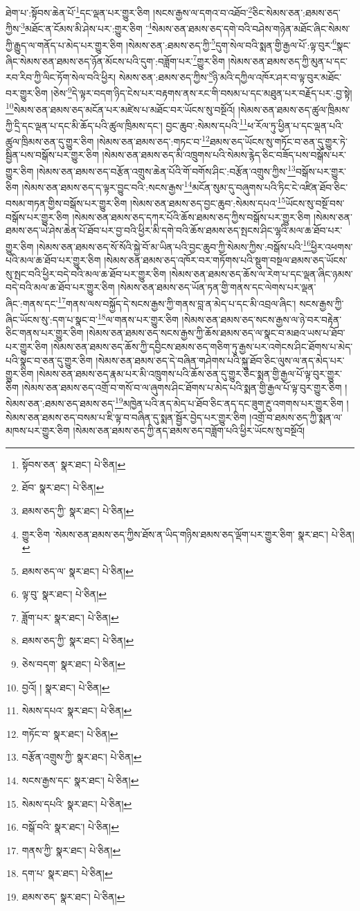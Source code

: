 ཐེག་པ་:སྟོབས་ཆེན་པོ་\footnote{སྟོབས་ཅན་  སྣར་ཐང་།  པེ་ཅིན། }དང་ལྡན་པར་གྱུར་ཅིག །སངས་རྒྱས་ལ་དགའ་བ་འཐོབ་\footnote{ཐོབ་  སྣར་ཐང་།  པེ་ཅིན། }ཅིང་སེམས་ཅན་:ཐམས་ཅད་ཀྱིས་\footnote{ཐམས་ཅད་ཀྱི་  སྣར་ཐང་།  པེ་ཅིན། }མཐོང་ན་ངོམས་མི་ཤེས་པར་:གྱུར་ཅིག ་\footnote{གྱུར་ཅིག ་སེམས་ཅན་ཐམས་ཅད་ཀྱིས་ཐོས་ན་ཡིད་གཉིས་ཐམས་ཅད་ལྡོག་པར་གྱུར་ཅིག་  སྣར་ཐང་།  པེ་ཅིན། }སེམས་ཅན་ཐམས་ཅད་དགེ་བའི་བཤེས་གཉེན་མཐོང་ཞིང་སེམས་ཀྱི་རྒྱུད་ལ་གནོད་པ་མེད་པར་གྱུར་ཅིག །སེམས་ཅན་:ཐམས་ཅད་ཀྱི་\footnote{ཐམས་ཅད་ལ་  སྣར་ཐང་།  པེ་ཅིན། }དུག་སེལ་བའི་སྨན་གྱི་རྒྱལ་པོ་:ལྟ་བུར་\footnote{ལྟ་བུ་  སྣར་ཐང་།  པེ་ཅིན། }སྣང་ཞིང་སེམས་ཅན་ཐམས་ཅད་ཉོན་མོངས་པའི་དུག་:བཟློག་པར་\footnote{ཟློག་པར་  སྣར་ཐང་།  པེ་ཅིན། }གྱུར་ཅིག །སེམས་ཅན་ཐམས་ཅད་ཀྱི་མུན་པ་དང་རབ་རིབ་ཀྱི་ལིང་ཏོག་སེལ་བའི་ཕྱིར། སེམས་ཅན་:ཐམས་ཅད་ཀྱིས་\footnote{ཐམས་ཅད་ཀྱི་  སྣར་ཐང་།  པེ་ཅིན། }ཉི་མའི་དཀྱིལ་འཁོར་ཤར་བ་ལྟ་བུར་མཐོང་བར་གྱུར་ཅིག །ཅེས་\footnote{ཅེས་བདག་  སྣར་ཐང་།  པེ་ཅིན། }དེ་ལྟར་བདག་ཉིད་ངེས་པར་བརྟགས་ནས་རང་གི་བསམ་པ་དང་མཐུན་པར་བརྗོད་པར་:བྱ་སྟེ། \footnote{བྱའོ། །   སྣར་ཐང་།  པེ་ཅིན། }སེམས་ཅན་ཐམས་ཅད་མངོན་པར་མཛེས་པ་མཐོང་བར་ཡོངས་སུ་བསྔོའོ། །སེམས་ཅན་ཐམས་ཅད་ཚུལ་ཁྲིམས་ཀྱི་དྲི་དང་ལྡན་པ་དང་མི་ཆོད་པའི་ཚུལ་ཁྲིམས་དང་། བྱང་ཆུབ་:སེམས་དཔའི་\footnote{སེམས་དཔའ་  སྣར་ཐང་།  པེ་ཅིན། }ཕ་རོལ་ཏུ་ཕྱིན་པ་དང་ལྡན་པའི་ཚུལ་ཁྲིམས་ཅན་དུ་གྱུར་ཅིག །སེམས་ཅན་ཐམས་ཅད་:གཏང་བ་\footnote{གཏོང་བ་  སྣར་ཐང་།  པེ་ཅིན། }ཐམས་ཅད་ཡོངས་སུ་གཏོང་བ་ཅན་དུ་གྱུར་ཏེ་སྦྱིན་པས་བསྒོས་པར་གྱུར་ཅིག །སེམས་ཅན་ཐམས་ཅད་མི་འཁྲུགས་པའི་སེམས་རྙེད་ཅིང་བཟོད་པས་བསྒོས་པར་གྱུར་ཅིག །སེམས་ཅན་ཐམས་ཅད་བརྩོན་འགྲུས་ཆེན་པོའི་གོ་བགོས་ཤིང་:བརྩོན་འགྲུས་ཀྱིས་\footnote{བརྩོན་འགྲུས་ཀྱི་  སྣར་ཐང་།  པེ་ཅིན། }བསྒོས་པར་གྱུར་ཅིག །སེམས་ཅན་ཐམས་ཅད་ད་ལྟར་བྱུང་བའི་:སངས་རྒྱས་\footnote{སངས་རྒྱས་དང་  སྣར་ཐང་།  པེ་ཅིན། }མངོན་སུམ་དུ་བཞུགས་པའི་ཏིང་ངེ་འཛིན་ཐོབ་ཅིང་བསམ་གཏན་གྱིས་བསྒོས་པར་གྱུར་ཅིག །སེམས་ཅན་ཐམས་ཅད་བྱང་ཆུབ་:སེམས་དཔའ་\footnote{སེམས་དཔའི་  སྣར་ཐང་།  པེ་ཅིན། }ཡོངས་སུ་བསྔོ་བས་བསྒོས་པར་གྱུར་ཅིག །སེམས་ཅན་ཐམས་ཅད་དཀར་པོའི་ཆོས་ཐམས་ཅད་ཀྱིས་བསྒོས་པར་གྱུར་ཅིག །སེམས་ཅན་ཐམས་ཅད་ཡེ་ཤེས་ཆེན་པོ་ཐོབ་པར་བྱ་བའི་ཕྱིར་མི་དགེ་བའི་ཆོས་ཐམས་ཅད་སྤངས་ཤིང་ལྷའི་མལ་ཆ་ཐོབ་པར་གྱུར་ཅིག །སེམས་ཅན་ཐམས་ཅད་སོ་སོའི་སྐྱེ་བོ་མ་ཡིན་པའི་བྱང་ཆུབ་ཀྱི་སེམས་ཀྱིས་:བསྒོས་པའི་\footnote{བསྒོ་བའི་  སྣར་ཐང་།  པེ་ཅིན། }ཕྱིར་འཕགས་པའི་མལ་ཆ་ཐོབ་པར་གྱུར་ཅིག །སེམས་ཅན་ཐམས་ཅད་འཁོར་བར་གཏོགས་པའི་སྡུག་བསྔལ་ཐམས་ཅད་ཡོངས་སུ་སྤང་བའི་ཕྱིར་བདེ་བའི་མལ་ཆ་ཐོབ་པར་གྱུར་ཅིག །སེམས་ཅན་ཐམས་ཅད་ཆོས་ལ་རེག་པ་དང་ལྡན་ཞིང་ཉམས་བདེ་བའི་མལ་ཆ་ཐོབ་པར་གྱུར་ཅིག །སེམས་ཅན་ཐམས་ཅད་ཡོན་ཏན་གྱི་གནས་དང་ལེགས་པར་ལྡན་ཞིང་:གནས་དང་\footnote{གནས་ཀྱི་  སྣར་ཐང་།  པེ་ཅིན། }གནས་ལས་བསྐྱོད་དེ་སངས་རྒྱས་ཀྱི་གནས་བླ་ན་མེད་པ་དང་མི་འབྲལ་ཞིང་། སངས་རྒྱས་ཀྱི་ཞིང་ཡོངས་སུ་:དག་པ་སྣང་བ་\footnote{དག་པ་  སྣར་ཐང་།  པེ་ཅིན། }ལ་གནས་པར་གྱུར་ཅིག །སེམས་ཅན་ཐམས་ཅད་སངས་རྒྱས་ལ་ཉེ་བར་བརྟེན་ཅིང་གནས་པར་གྱུར་ཅིག །སེམས་ཅན་ཐམས་ཅད་སངས་རྒྱས་ཀྱི་ཆོས་ཐམས་ཅད་ལ་སྣང་བ་མཐའ་ཡས་པ་ཐོབ་པར་གྱུར་ཅིག །སེམས་ཅན་ཐམས་ཅད་ཆོས་ཀྱི་དབྱིངས་ཐམས་ཅད་གཅིག་ཏུ་རྒྱས་པར་འགེངས་ཤིང་ཐོགས་པ་མེད་པའི་སྣང་བ་ཅན་དུ་གྱུར་ཅིག །སེམས་ཅན་ཐམས་ཅད་དེ་བཞིན་གཤེགས་པའི་སྐུ་ཐོབ་ཅིང་ལུས་ལ་ནད་མེད་པར་གྱུར་ཅིག །སེམས་ཅན་ཐམས་ཅད་རྣམ་པར་མི་འཁྲུགས་པའི་ཆོས་ཅན་དུ་གྱུར་ཅིང་སྨན་གྱི་རྒྱལ་པོ་ལྟ་བུར་གྱུར་ཅིག །སེམས་ཅན་ཐམས་ཅད་འགྲོ་བ་གསོ་བ་ལ་ཞུགས་ཤིང་ཐོགས་པ་མེད་པའི་སྨན་གྱི་རྒྱལ་པོ་ལྟ་བུར་གྱུར་ཅིག །སེམས་ཅན་:ཐམས་ཅད་ཐམས་ཅད་\footnote{ཐམས་ཅད་  སྣར་ཐང་།  པེ་ཅིན། }མཁྱེན་པའི་ནད་མེད་པ་ཐོབ་ཅིང་ནད་དང་ཟུག་རྔུ་འགགས་པར་གྱུར་ཅིག །སེམས་ཅན་ཐམས་ཅད་བསམ་པ་ཇི་ལྟ་བ་བཞིན་དུ་སྨན་སྦྱོར་བྱེད་པར་གྱུར་ཅིག །འགྲོ་བ་ཐམས་ཅད་ཀྱི་སྨན་ལ་མཁས་པར་གྱུར་ཅིག །སེམས་ཅན་ཐམས་ཅད་ཀྱི་ནད་ཐམས་ཅད་བཟློག་པའི་ཕྱིར་ཡོངས་སུ་བསྔོའོ། 